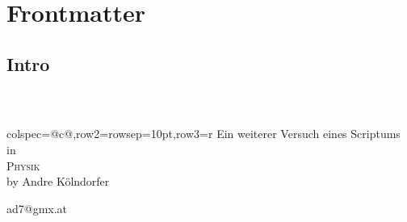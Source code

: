 \newrefsegment
\section{\label{sec0001_fm}Frontmatter}
\subsection*{Intro}
\begin{frame}
  \frametitle{\ {}}
  \begin{center}
    \begin{tblr}{colspec={@{}c@{}},row{2}={rowsep=10pt},row{3}={r}}
      Ein weiterer Versuch eines Scriptums in\\
      \cline[2pt]{-}
       {\fontsize{25mm}{20mm}\selectfont\scshape Physik} \\
      \cline[2pt]{-}
      \small by Andre K\"olndorfer
  \end{tblr}
  \end{center}

  {\tiny\adVers\textcopyright{}ad7@gmx.at}

\end{frame}

